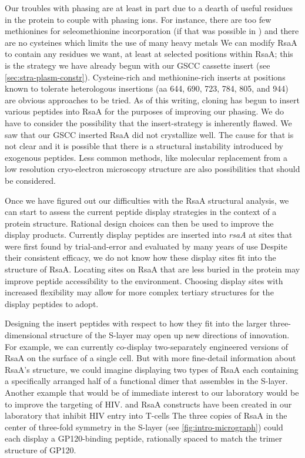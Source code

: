 Our troubles with phasing are at least in part due to a dearth of useful residues in the protein to couple with phasing ions. For instance, there are too few methionines for seleomethionine incorporation (if that was possible in \caulobacter{}) and there are no cysteines which limits the use of many heavy metals We can modify RsaA to contain any residues we want, at least at selected positions within RsaA; this is the strategy we have already begun with our GSCC cassette insert (see \cref{sec:stra-plasm-constr}). Cysteine-rich and methionine-rich inserts at positions known to tolerate heterologous insertions (\eg \ac{aa} 644, 690, 723, 784, 805, and 944) are obvious approaches to be tried. As of this writing, cloning has begun to insert various peptides into RsaA for the purposes of improving our phasing. We do have to consider the possibility that the insert-strategy is inherently flawed. We saw that our GSCC inserted RsaA did not crystallize well. The cause for that is not clear and it is possible that there is a structural instability introduced by exogenous peptides. Less common methods, like molecular replacement from a low resolution cryo-electron microscopy structure are also possibilities that should be considered. 

Once we have figured out our difficulties with the RsaA structural analysis, we can start to assess the
current peptide display strategies in the context of a protein  structure.
Rational design choices can then be used to improve the display products. Currently display peptides are inserted into \textit{rsaA} at sites that were first found by trial-and-error and evaluated by many years of use Despite their consistent efficacy, we do not know how these display sites fit into the structure of RsaA. Locating sites on RsaA that are less buried in the protein may improve peptide accessibility to the environment. Choosing display sites with increased flexibility may allow for more complex tertiary structures for the display peptides to adopt. 

Designing the insert peptides with respect to how they fit into the larger
three-dimensional structure of the \ac{S-layer} may open up new directions of
innovation. For example, we can currently co-display two-separately engineered
versions of RsaA on the surface of a single \caulobacter cell. But with more
fine-detail information about RsaA's structure, we could imagine displaying two
types of RsaA each containing  a specifically arranged half of a functional
dimer that assembles in the \ac{S-layer}. Another example that would be of
immediate interest to our laboratory would be to improve the targeting of HIV.
\caulobacter and RsaA constructs have been created in our laboratory that
inhibit HIV entry into T-cells The three copies of RsaA in the center of three-fold symmetry in the \ac{S-layer} (see \cref{fig:intro-micrograph}) could each display a GP120-binding peptide, rationally spaced to match the trimer structure of GP120.

